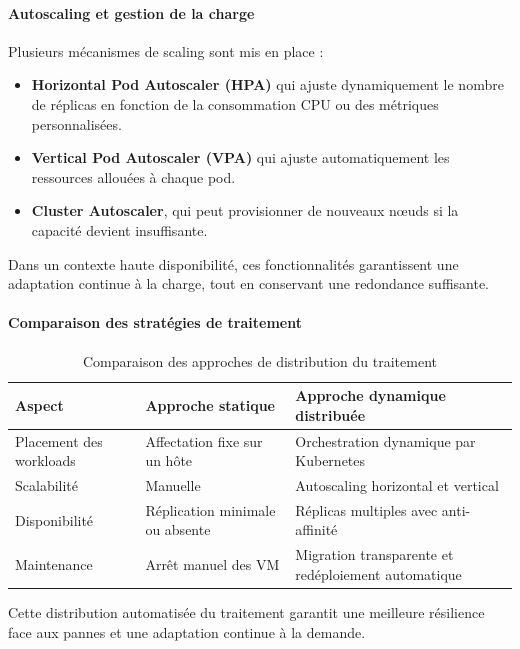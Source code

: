 \paragraph{Autoscaling et gestion de la charge}
Plusieurs mécanismes de scaling sont mis en place :
\begin{itemize}
	\item \textbf{Horizontal Pod Autoscaler (HPA)} qui ajuste dynamiquement le nombre de réplicas en fonction de la consommation CPU ou des métriques personnalisées.
	\item \textbf{Vertical Pod Autoscaler (VPA)} qui ajuste automatiquement les ressources allouées à chaque pod.
	\item \textbf{Cluster Autoscaler}, qui peut provisionner de nouveaux nœuds si la capacité devient insuffisante.
\end{itemize}
Dans un contexte haute disponibilité, ces fonctionnalités garantissent une adaptation continue à la charge, tout en conservant une redondance suffisante.

\paragraph{Comparaison des stratégies de traitement}
\begin{table}[H]
	\renewcommand{\arraystretch}{1.3}
	\centering
	\begin{tabular}{|p{4cm}|p{5cm}|p{5cm}|}
		\hline
		\textbf{Aspect}         & \textbf{Approche statique}      & \textbf{Approche dynamique distribuée}              \\
		\hline
		Placement des workloads & Affectation fixe sur un hôte    & Orchestration dynamique par Kubernetes              \\
		\hline
		Scalabilité             & Manuelle                        & Autoscaling horizontal et vertical                  \\
		\hline
		Disponibilité           & Réplication minimale ou absente & Réplicas multiples avec anti-affinité               \\
		\hline
		Maintenance             & Arrêt manuel des VM             & Migration transparente et redéploiement automatique \\
		\hline
	\end{tabular}
	\caption{Comparaison des approches de distribution du traitement}
\end{table}

Cette distribution automatisée du traitement garantit une meilleure résilience face aux pannes et une adaptation continue à la demande.

